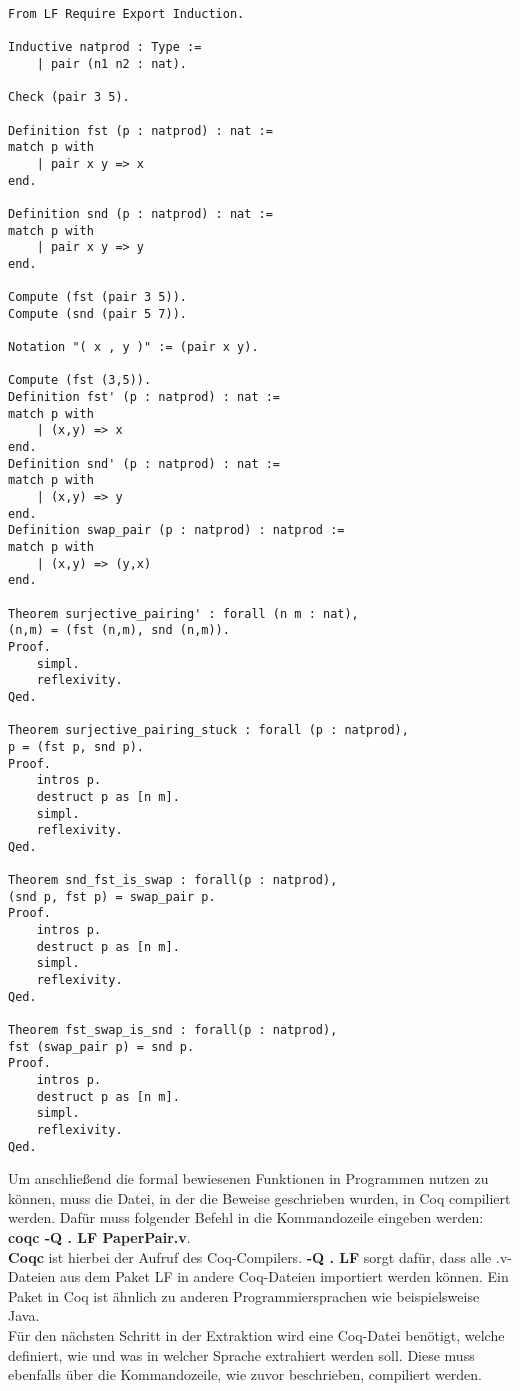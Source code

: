 \begin{lstlisting}[language=coq,firstnumber=1,caption=Coq Beispielbeweis,label=lst:practical-proof]
From LF Require Export Induction.

Inductive natprod : Type :=
	| pair (n1 n2 : nat).

Check (pair 3 5).

Definition fst (p : natprod) : nat :=
match p with
	| pair x y => x
end.

Definition snd (p : natprod) : nat :=
match p with
	| pair x y => y
end.

Compute (fst (pair 3 5)).
Compute (snd (pair 5 7)).

Notation "( x , y )" := (pair x y).

Compute (fst (3,5)).
Definition fst' (p : natprod) : nat :=
match p with
	| (x,y) => x
end.
Definition snd' (p : natprod) : nat :=
match p with
	| (x,y) => y
end.
Definition swap_pair (p : natprod) : natprod :=
match p with
	| (x,y) => (y,x)
end.

Theorem surjective_pairing' : forall (n m : nat),
(n,m) = (fst (n,m), snd (n,m)).
Proof.
	simpl.
	reflexivity. 
Qed.

Theorem surjective_pairing_stuck : forall (p : natprod),
p = (fst p, snd p).
Proof.
	intros p.
	destruct p as [n m].  
	simpl.
	reflexivity.
Qed.

Theorem snd_fst_is_swap : forall(p : natprod),
(snd p, fst p) = swap_pair p.
Proof.
	intros p.
	destruct p as [n m].
	simpl.
	reflexivity.
Qed.

Theorem fst_swap_is_snd : forall(p : natprod),
fst (swap_pair p) = snd p.
Proof.
	intros p.
	destruct p as [n m].
	simpl.
	reflexivity.
Qed.
\end{lstlisting}
Um anschließend die formal bewiesenen Funktionen in Programmen nutzen zu können, muss die Datei, in der die Beweise geschrieben wurden, in Coq compiliert werden. Dafür muss folgender Befehl in die Kommandozeile eingeben werden:
\textbf{coqc -Q . LF PaperPair.v}. \\
\textbf{Coqc} ist hierbei der Aufruf des Coq-Compilers. \textbf{-Q . LF} sorgt dafür, dass alle .v-Dateien aus dem Paket LF in andere Coq-Dateien importiert werden können. Ein Paket in Coq ist ähnlich zu anderen Programmiersprachen wie beispielsweise Java.
\\
Für den nächsten Schritt in der Extraktion wird eine Coq-Datei benötigt, welche definiert, wie und was in welcher Sprache extrahiert werden soll. Diese muss ebenfalls über die Kommandozeile, wie zuvor beschrieben, compiliert werden.

